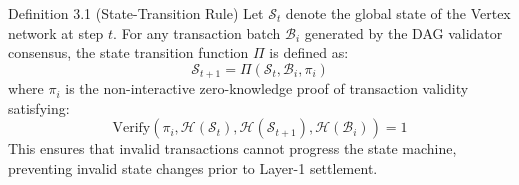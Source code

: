\begin{modelbox}{Definition 3.1 (State-Transition Rule)}
Let $\mathcal{S}_t$ denote the global state of the Vertex network at step $t$. For any transaction batch $\mathcal{B}_i$ generated by the DAG validator consensus, the state transition function $\Pi$ is defined as:
\begin{equation}
\mathcal{S}_{t+1} = \Pi(\mathcal{S}_t, \mathcal{B}_i, \pi_i)
\end{equation}
where $\pi_i$ is the non-interactive zero-knowledge proof of transaction validity satisfying:
\begin{equation}
\text{Verify}(\pi_i, \mathcal{H}(\mathcal{S}_t), \mathcal{H}(\mathcal{S}_{t+1}), \mathcal{H}(\mathcal{B}_i)) = 1
\end{equation}
This ensures that invalid transactions cannot progress the state machine, preventing invalid state changes prior to Layer-1 settlement.
\end{modelbox}
